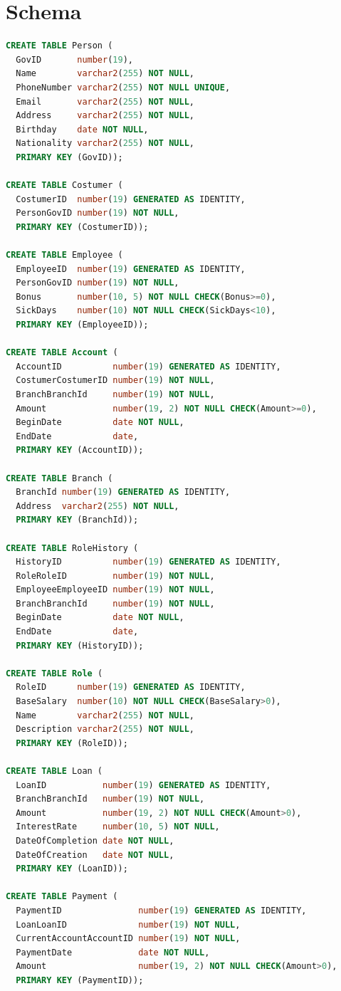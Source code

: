 \documentclass[a4paper, 10pt]{article}
\begin{document}
\section{Schema}
\begin{lstlisting}[language=SQL]
CREATE TABLE Person (
  GovID       number(19), 
  Name        varchar2(255) NOT NULL, 
  PhoneNumber varchar2(255) NOT NULL UNIQUE, 
  Email       varchar2(255) NOT NULL, 
  Address     varchar2(255) NOT NULL, 
  Birthday    date NOT NULL, 
  Nationality varchar2(255) NOT NULL, 
  PRIMARY KEY (GovID));

CREATE TABLE Costumer (
  CostumerID  number(19) GENERATED AS IDENTITY, 
  PersonGovID number(19) NOT NULL, 
  PRIMARY KEY (CostumerID));

CREATE TABLE Employee (
  EmployeeID  number(19) GENERATED AS IDENTITY, 
  PersonGovID number(19) NOT NULL, 
  Bonus       number(10, 5) NOT NULL CHECK(Bonus>=0), 
  SickDays    number(10) NOT NULL CHECK(SickDays<10), 
  PRIMARY KEY (EmployeeID));

CREATE TABLE Account (
  AccountID          number(19) GENERATED AS IDENTITY, 
  CostumerCostumerID number(19) NOT NULL, 
  BranchBranchId     number(19) NOT NULL, 
  Amount             number(19, 2) NOT NULL CHECK(Amount>=0), 
  BeginDate          date NOT NULL, 
  EndDate            date, 
  PRIMARY KEY (AccountID));

CREATE TABLE Branch (
  BranchId number(19) GENERATED AS IDENTITY, 
  Address  varchar2(255) NOT NULL, 
  PRIMARY KEY (BranchId));

CREATE TABLE RoleHistory (
  HistoryID          number(19) GENERATED AS IDENTITY, 
  RoleRoleID         number(19) NOT NULL, 
  EmployeeEmployeeID number(19) NOT NULL, 
  BranchBranchId     number(19) NOT NULL, 
  BeginDate          date NOT NULL, 
  EndDate            date, 
  PRIMARY KEY (HistoryID));

CREATE TABLE Role (
  RoleID      number(19) GENERATED AS IDENTITY, 
  BaseSalary  number(10) NOT NULL CHECK(BaseSalary>0), 
  Name        varchar2(255) NOT NULL, 
  Description varchar2(255) NOT NULL, 
  PRIMARY KEY (RoleID));

CREATE TABLE Loan (
  LoanID           number(19) GENERATED AS IDENTITY, 
  BranchBranchId   number(19) NOT NULL, 
  Amount           number(19, 2) NOT NULL CHECK(Amount>0), 
  InterestRate     number(10, 5) NOT NULL, 
  DateOfCompletion date NOT NULL, 
  DateOfCreation   date NOT NULL, 
  PRIMARY KEY (LoanID));

CREATE TABLE Payment (
  PaymentID               number(19) GENERATED AS IDENTITY, 
  LoanLoanID              number(19) NOT NULL, 
  CurrentAccountAccountID number(19) NOT NULL, 
  PaymentDate             date NOT NULL, 
  Amount                  number(19, 2) NOT NULL CHECK(Amount>0), 
  PRIMARY KEY (PaymentID));


\end{lstlisting}
\end{document}
